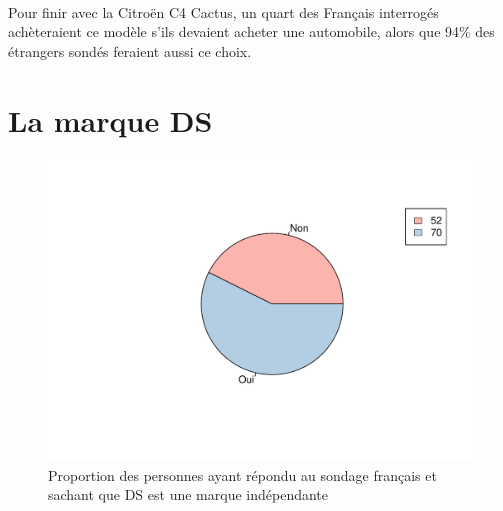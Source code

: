 \documentclass[12pt]{article}\usepackage[]{graphicx}\usepackage[]{color}
\makeatletter
\def\maxwidth{ %
  \ifdim\Gin@nat@width>\linewidth
    \linewidth
  \else
    \Gin@nat@width
  \fi
}
\newenvironment{knitrout}{}{} %
\makeatother
\begin{document}
\paragraph{} Pour finir avec la Citroën C4 Cactus, un quart des Français
interrogés achèteraient ce modèle s'ils devaient acheter une automobile, alors
que 94\% des étrangers sondés feraient aussi ce choix.

\break
\section{La marque DS}

\begin{knitrout}
\color{fgcolor}\begin{figure}[H]
\includegraphics[width=\maxwidth]{figure/ds_know_fr-1} \caption[Proportion des personnes ayant répondu au sondage français et sachant que DS est une marque indépendante]{Proportion des personnes ayant répondu au sondage français et sachant que DS est une marque indépendante}\label{fig:ds know fr}
\end{figure}


\end{knitrout}
\end{document}
